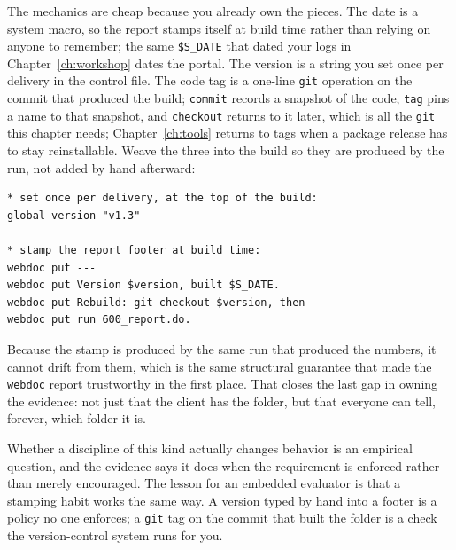 \documentclass[
    a4paper,
    fontsize=10pt,
    twoside=true,
    numbers=noenddot,
]{kaobook}
\begin{document}
The mechanics are cheap because you already own the pieces. The date is a system macro, so the report stamps itself at build time rather than relying on anyone to remember; the same \texttt{\$S\_DATE} that dated your logs in Chapter~\ref{ch:workshop} dates the portal. The version is a string you set once per delivery in the control file. The code tag is a one-line \texttt{git} operation on the commit that produced the build; \texttt{commit} records a snapshot of the code, \texttt{tag} pins a name to that snapshot, and \texttt{checkout} returns to it later, which is all the \texttt{git} this chapter needs; Chapter~\ref{ch:tools} returns to tags when a package release has to stay reinstallable. Weave the three into the build so they are produced by the run, not added by hand afterward:
\par
{\footnotesize
\begin{verbatim}
* set once per delivery, at the top of the build:
global version "v1.3"

* stamp the report footer at build time:
webdoc put ---
webdoc put Version $version, built $S_DATE.
webdoc put Rebuild: git checkout $version, then
webdoc put run 600_report.do.
\end{verbatim}
}
Because the stamp is produced by the same run that produced the numbers, it cannot drift from them, which is the same structural guarantee that made the \texttt{webdoc} report trustworthy in the first place. That closes the last gap in owning the evidence: not just that the client has the folder, but that everyone can tell, forever, which folder it is.

Whether a discipline of this kind actually changes behavior is an empirical question, and the evidence says it does when the requirement is enforced rather than merely encouraged. The lesson for an embedded evaluator is that a stamping habit works the same way. A version typed by hand into a footer is a policy no one enforces; a \texttt{git} tag on the commit that built the folder is a check the version-control system runs for you.
\end{document}

